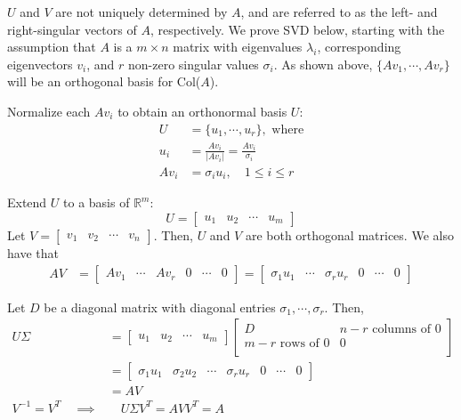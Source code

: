\documentclass[]{article}
\newcommand{\norm}[1]{\lvert #1 \rvert}
\begin{document}
$U$ and $V$ are not uniquely determined by $A$, and are referred to as the left- and right-singular vectors of $A$, respectively. We prove SVD below, starting with the assumption that $A$ is a $m \times n$ matrix with eigenvalues $\lambda_{i}$, corresponding eigenvectors $v_{i}$, and $r$ non-zero singular values $\sigma_{i}$. As shown above, $\{Av_{1}, \dotsm, Av_{r} \}$ will be an orthogonal basis for Col($A$). 

Normalize each $Av_{i}$ to obtain an orthonormal basis $U$:
\begin{align*}
U &= \{u_{1}, \dotsm, u_{r} \}, \textrm{ where} \\
 u_{i} &= \frac{Av_{i}}{\norm{Av_{i}}} = \frac{Av_{i}}{\sigma_{i}} \\
 Av_{i} &= \sigma_{i}u_{i}, \quad 1 \leq i \leq r 
\end{align*}

Extend $U$ to a basis of $\mathds{R}^{m}$: 
\begin{equation*}
U = \begin{bmatrix}
u_{1} & u_{2} & \dotsm & u_{m} 
\end{bmatrix} 
\end{equation*}
Let $V = \begin{bmatrix}
	v_{1} & v_{2} & \dotsm & v_{n}
\end{bmatrix}$. Then, $U$ and $V$ are both orthogonal matrices. We also have that
\begin{align*}
AV &= \begin{bmatrix}
Av_{1} & \dotsm & Av_{r} & 0 & \dotsm & 0
\end{bmatrix} = \begin{bmatrix}
\sigma_{1}u_{1} & \dotsm & \sigma_{r}u_{r} & 0 & \dotsm & 0
\end{bmatrix}
\end{align*}

Let $D$ be a diagonal matrix with diagonal entries $\sigma_{1}, \dotsm, \sigma_{r}$. Then,
\begin{align*}
U\Sigma &= \begin{bmatrix}
u_{1} & u_{2} & \dotsm & u_{m}
\end{bmatrix} \begin{bmatrix}
D & \textrm{$n - r$ columns of $0$} \\
\textrm{$m-r$ rows of $0$} & 0 \\
\end{bmatrix} \\
&= \begin{bmatrix}
\sigma_{1}u_{1} & \sigma_{2}u_{2} & \dotsm & \sigma_{r}u_{r} & 0 & \dotsm & 0
\end{bmatrix} \\
&= AV \\
V^{-1} = V^{T} \quad \implies &\quad U\Sigma V^{T} = AVV^{T} = A 
\end{align*}
\end{document}
